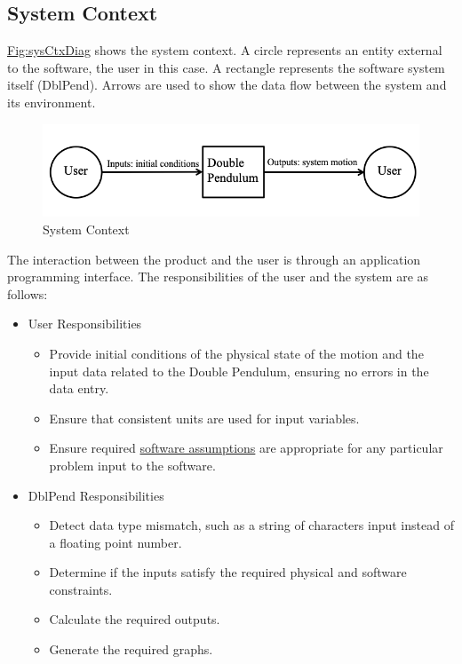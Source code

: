 \documentclass[12pt]{article}
\begin{document}
{\subsection{System Context}
\label{Sec:SysContext}
\hyperref[Figure:sysCtxDiag]{Fig:sysCtxDiag} shows the system context. A circle represents an entity external to the software, the user in this case. A rectangle represents the software system itself (DblPend). Arrows are used to show the data flow between the system and its environment.

\begin{figure}[H]
\begin{center}
\includegraphics[width=\textwidth]{../../../../datafiles/dblpend/SystemContextFigure.png}
\caption{System Context}
\label{Figure:sysCtxDiag}
\end{center}
\end{figure}
The interaction between the product and the user is through an application programming interface. The responsibilities of the user and the system are as follows:

\begin{itemize}
\item{User Responsibilities}
\begin{itemize}
\item{Provide initial conditions of the physical state of the motion and the input data related to the Double Pendulum, ensuring no errors in the data entry.}
\item{Ensure that consistent units are used for input variables.}
\item{Ensure required \hyperref[Sec:Assumps]{software assumptions} are appropriate for any particular problem input to the software.}
\end{itemize}
\item{DblPend Responsibilities}
\begin{itemize}
\item{Detect data type mismatch, such as a string of characters input instead of a floating point number.}
\item{Determine if the inputs satisfy the required physical and software constraints.}
\item{Calculate the required outputs.}
\item{Generate the required graphs.}
\end{itemize}
\end{itemize}
}
\end{document}
